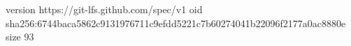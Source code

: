 version https://git-lfs.github.com/spec/v1
oid sha256:6744baca5862c9131976711c9efdd5221c7b60274041b22096f2177a0ac8880e
size 93
